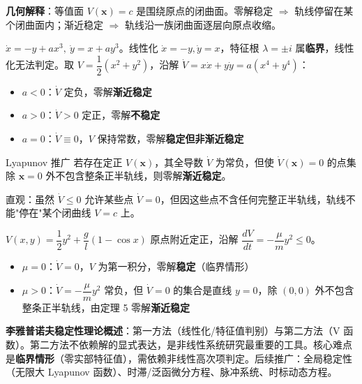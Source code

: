 \textbf{几何解释}：等值面 $V(\mathbf{x}) = c$ 是围绕原点的闭曲面。零解稳定 $\Rightarrow$ 轨线停留在某个闭曲面内；渐近稳定 $\Rightarrow$ 轨线沿一族闭曲面逐层向原点收缩。

\begin{example}
$\dot{x} = -y + ax^3, \ \dot{y} = x + ay^3$。线性化 $\dot{x} = -y, \dot{y} = x$，特征根 $\lambda = \pm i$ 属\textbf{临界}，线性化无法判定。取 $V = \dfrac{1}{2}(x^2 + y^2)$，沿解 $\dot{V} = x\dot{x} + y\dot{y} = a(x^4 + y^4)$：
\begin{itemize}
    \item $a < 0$：$\dot{V}$ 定负，零解\textbf{渐近稳定}
    \item $a > 0$：$\dot{V} > 0$ 定正，零解\textbf{不稳定}
    \item $a = 0$：$\dot{V} \equiv 0$，$V$ 保持常数，零解\textbf{稳定但非渐近稳定}
\end{itemize}
\end{example}

\begin{myTheorem}{Lyapunov 推广}
若存在定正 $V(\mathbf{x})$，其全导数 $\dot{V}$ 为常负，但使 $\dot{V}(\mathbf{x}) = 0$ 的点集除 $\mathbf{x} = 0$ 外不包含整条正半轨线，则零解\textbf{渐近稳定}。
\end{myTheorem}

\begin{remark}
直观：虽然 $\dot{V} \le 0$ 允许某些点 $\dot{V} = 0$，但因这些点不含任何完整正半轨线，轨线不能"停在"某个闭曲线 $V = c$ 上。
\end{remark}

\begin{example}
$V(x,y) = \dfrac{1}{2}y^2 + \dfrac{g}{l}(1 - \cos x)$ 原点附近定正，沿解 $\dfrac{dV}{dt} = -\dfrac{\mu}{m}y^2 \le 0$。
\begin{itemize}
    \item $\mu = 0$：$\dot{V} = 0$，$V$ 为第一积分，零解\textbf{稳定}（临界情形）
    \item $\mu > 0$：$\dot{V} = -\dfrac{\mu}{m}y^2$ 常负，但 $\dot{V} = 0$ 的集合是直线 $y = 0$，除 $(0,0)$ 外不包含整条正半轨线，由定理 5 零解\textbf{渐近稳定}
\end{itemize}
\end{example}

\textbf{李雅普诺夫稳定性理论概述}：第一方法（线性化/特征值判别）与第二方法（V 函数）。第二方法不依赖解的显式表达，是非线性系统研究最重要的工具。核心难点是\textbf{临界情形}（零实部特征值），需依赖非线性高次项判定。后续推广：全局稳定性（无限大 Lyapunov 函数）、时滞/泛函微分方程、脉冲系统、时标动态方程。

